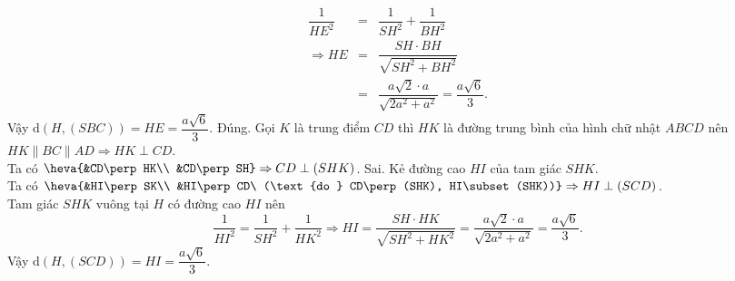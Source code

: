\begin{ex}
{\begin{itemchoice}
			\begin{eqnarray*}
				\dfrac{1}{HE^2} &=&\dfrac{1}{SH^2}+\dfrac{1}{BH^2} \\
				\Rightarrow HE&=&\dfrac{SH\cdot BH}{\sqrt{SH^2+BH^2}} \\
				&=&\dfrac{a \sqrt{2} \cdot a}{\sqrt{2 a^2+a^2}}=\dfrac{a \sqrt{6}}{3}.
			\end{eqnarray*}
			Vậy $\mathrm{d}(H, (SBC))=HE=\dfrac{a \sqrt{6}}{3}$.
			\itemch Đúng. Gọi $K$ là trung điểm $CD$ thì $HK$ là đường trung bình của hình chữ nhật $ABCD$ nên ${HK\parallel BC\parallel AD\Rightarrow HK\perp CD}$.\\
			Ta có ${\heva{&CD\perp HK\\ &CD\perp SH} \Rightarrow CD\perp(SHK)}$.
			\itemch Sai. Kẻ đường cao $HI$ của tam giác $SHK$.\\
			Ta có $\heva{&HI\perp SK\\ &HI\perp CD\ (\text{do } CD\perp(SHK), HI\subset(SHK))} \Rightarrow HI\perp(SCD)$.\\
			Tam giác $SHK$ vuông tại $H$ có đường cao $HI$ nên
			$$\dfrac{1}{HI^2}=\dfrac{1}{SH^2}+\dfrac{1}{HK^2} \Rightarrow HI=\dfrac{SH\cdot HK}{\sqrt{SH^2+HK^2}}=\dfrac{a \sqrt{2} \cdot a}{\sqrt{2a^2+a^2}}=\dfrac{a \sqrt{6}}{3}.$$
			Vậy $\mathrm{d}(H, (SCD))=HI=\dfrac{a \sqrt{6}}{3}$.
		\end{itemchoice}
	}
\end{ex}

